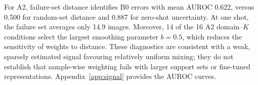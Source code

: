 

For A2, failure-set distance identifies B0 errors with mean AUROC 0.622, versus 0.500 for random-set distance and 0.887 for zero-shot uncertainty. At one shot, the failure set averages only 14.9 images. Moreover, 14 of the 16 A2 domain--$K$ conditions select the largest smoothing parameter $b=0.5$, which reduces the sensitivity of weights to distance. These diagnostics are consistent with a weak, sparsely estimated signal favouring relatively uniform mixing; they do not establish that sample-wise weighting fails with larger support sets or fine-tuned representations. Appendix~\ref{app:signal} provides the AUROC curves.
